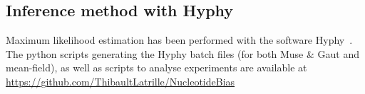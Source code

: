 \subsection{Inference method with Hyphy}

Maximum \gls{likelihood} estimation has been performed with the software Hyphy~\citep{Pond2005}.
The python scripts generating the Hyphy batch files (for both Muse \& Gaut and mean-field), as well as scripts to analyse experiments are available at \url{https://github.com/ThibaultLatrille/NucleotideBias}
